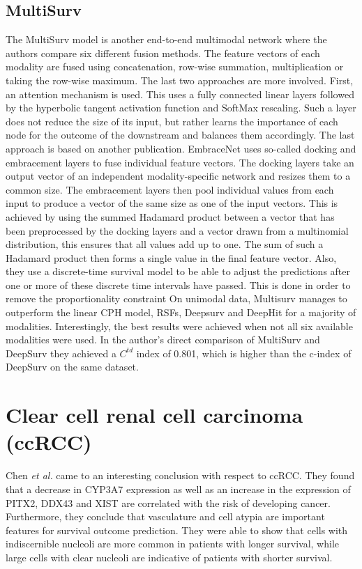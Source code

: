 \subsection{MultiSurv} 
The MultiSurv model is another end-to-end multimodal network where the authors compare six different fusion methods. The feature vectors of each modality are fused using concatenation, row-wise summation, multiplication or taking the row-wise maximum. The last two approaches are more involved. First, an attention mechanism is used. This uses a fully connected linear layers followed by the hyperbolic tangent activation function and SoftMax rescaling. \cite{ValeSilva2021Long} Such a layer does not reduce the size of its input, but rather learns the importance of each node for the outcome of the downstream and balances them accordingly. The last approach is based on another publication. EmbraceNet uses so-called docking and embracement layers to fuse individual feature vectors. The docking layers take an output vector of an independent modality-specific network and resizes them to a common size. The embracement layers then pool individual values from each input to produce a vector of the same size as one of the input vectors. This is achieved by using the summed Hadamard product between a vector that has been preprocessed by the docking layers and a vector drawn from a multinomial distribution, this ensures that all values add up to one. The sum of such a Hadamard product then forms a single value in the final feature vector. \cite{Choi2019EmbraceNet}
Also, they use a discrete-time survival model to be able to adjust the predictions after one or more of these discrete time intervals have passed. This is done in order to remove the proportionality constraint 
On unimodal data, Multisurv manages to outperform the linear CPH model, RSFs, Deepsurv and DeepHit for a majority of modalities. Interestingly, the best results were achieved when not all six available modalities were used. In the author's direct comparison of MultiSurv and DeepSurv they achieved a $C^{td}$ index of 0.801, which is higher than the c-index of DeepSurv on the same dataset. \cite{ValeSilva2021Long}

\clearpage

\section{Clear cell renal cell carcinoma (ccRCC)}

Chen \textit{et al.} came to an interesting conclusion with respect to ccRCC. They found that a decrease in CYP3A7 expression as well as an increase in the expression of PITX2, DDX43 and XIST are correlated with the risk of developing cancer. Furthermore, they conclude that vasculature and cell atypia are important features for survival outcome prediction. They were able to show that cells with indiscernible nucleoli are more common in patients with longer survival, while large cells with clear nucleoli are indicative of patients with shorter survival. \cite{Chen2022Pathomic}

